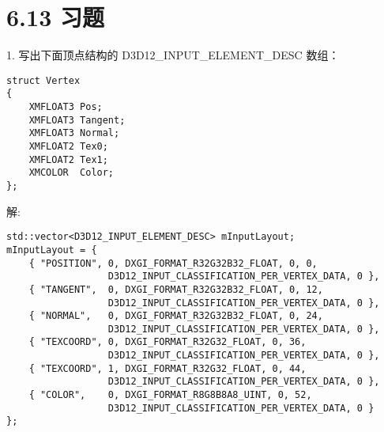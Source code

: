 \chapter{6.13 习题}
\begin{flushleft}
1. 写出下面顶点结构的 D3D12\_INPUT\_ELEMENT\_DESC 数组：
\end{flushleft}
\begin{lstlisting}
struct Vertex
{
    XMFLOAT3 Pos;
    XMFLOAT3 Tangent;
    XMFLOAT3 Normal;
    XMFLOAT2 Tex0;
    XMFLOAT2 Tex1;
    XMCOLOR  Color;
};
\end{lstlisting}
\begin{flushleft}
解:\\
\end{flushleft}
\begin{lstlisting}
std::vector<D3D12_INPUT_ELEMENT_DESC> mInputLayout;
mInputLayout = {
    { "POSITION", 0, DXGI_FORMAT_R32G32B32_FLOAT, 0, 0, 
                  D3D12_INPUT_CLASSIFICATION_PER_VERTEX_DATA, 0 },
    { "TANGENT",  0, DXGI_FORMAT_R32G32B32_FLOAT, 0, 12, 
                  D3D12_INPUT_CLASSIFICATION_PER_VERTEX_DATA, 0 },
    { "NORMAL",   0, DXGI_FORMAT_R32G32B32_FLOAT, 0, 24, 
                  D3D12_INPUT_CLASSIFICATION_PER_VERTEX_DATA, 0 },
    { "TEXCOORD", 0, DXGI_FORMAT_R32G32_FLOAT, 0, 36, 
                  D3D12_INPUT_CLASSIFICATION_PER_VERTEX_DATA, 0 },
    { "TEXCOORD", 1, DXGI_FORMAT_R32G32_FLOAT, 0, 44, 
                  D3D12_INPUT_CLASSIFICATION_PER_VERTEX_DATA, 0 },
    { "COLOR",    0, DXGI_FORMAT_R8G8B8A8_UINT, 0, 52, 
                  D3D12_INPUT_CLASSIFICATION_PER_VERTEX_DATA, 0 }
};
\end{lstlisting}

